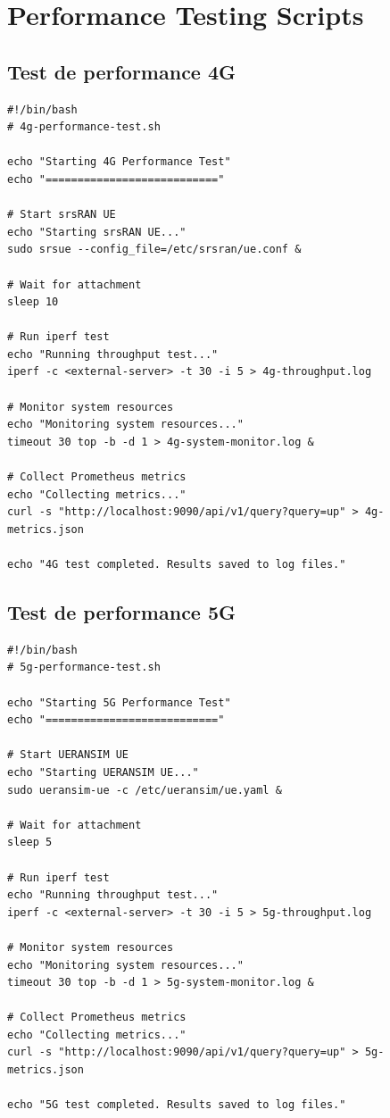 \documentclass[12pt,a4paper]{report}
\begin{document}
\section{Performance Testing Scripts}

\subsection{Test de performance 4G}

\begin{lstlisting}[caption=Script de tests de performance 4G]
#!/bin/bash
# 4g-performance-test.sh

echo "Starting 4G Performance Test"
echo "==========================="

# Start srsRAN UE
echo "Starting srsRAN UE..."
sudo srsue --config_file=/etc/srsran/ue.conf &

# Wait for attachment
sleep 10

# Run iperf test
echo "Running throughput test..."
iperf -c <external-server> -t 30 -i 5 > 4g-throughput.log

# Monitor system resources
echo "Monitoring system resources..."
timeout 30 top -b -d 1 > 4g-system-monitor.log &

# Collect Prometheus metrics
echo "Collecting metrics..."
curl -s "http://localhost:9090/api/v1/query?query=up" > 4g-metrics.json

echo "4G test completed. Results saved to log files."
\end{lstlisting}

\subsection{Test de performance 5G}

\begin{lstlisting}[caption=Script de tests de performance 5G]
#!/bin/bash
# 5g-performance-test.sh

echo "Starting 5G Performance Test"
echo "==========================="

# Start UERANSIM UE
echo "Starting UERANSIM UE..."
sudo ueransim-ue -c /etc/ueransim/ue.yaml &

# Wait for attachment
sleep 5

# Run iperf test
echo "Running throughput test..."
iperf -c <external-server> -t 30 -i 5 > 5g-throughput.log

# Monitor system resources
echo "Monitoring system resources..."
timeout 30 top -b -d 1 > 5g-system-monitor.log &

# Collect Prometheus metrics
echo "Collecting metrics..."
curl -s "http://localhost:9090/api/v1/query?query=up" > 5g-metrics.json

echo "5G test completed. Results saved to log files."
\end{lstlisting}
\end{document}
